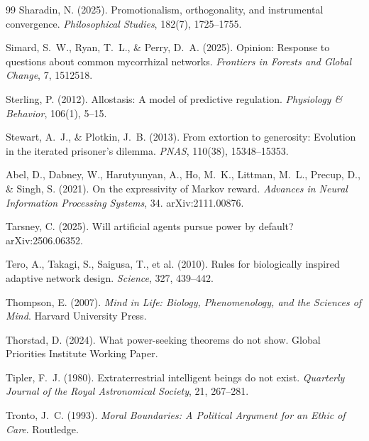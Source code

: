 \documentclass[11pt,a4paper,twocolumn]{article}
\begin{document}
\begin{thebibliography}{99}
 Sharadin, N. (2025). Promotionalism, orthogonality, and instrumental convergence. \textit{Philosophical Studies}, 182(7), 1725--1755.

 Simard, S.~W., Ryan, T.~L., \& Perry, D.~A. (2025). Opinion: Response to questions about common mycorrhizal networks. \textit{Frontiers in Forests and Global Change}, 7, 1512518.


 Sterling, P. (2012). Allostasis: A model of predictive regulation. \textit{Physiology \& Behavior}, 106(1), 5--15.

 Stewart, A.~J., \& Plotkin, J.~B. (2013). From extortion to generosity: Evolution in the iterated prisoner's dilemma. \textit{PNAS}, 110(38), 15348--15353.

 Abel, D., Dabney, W., Harutyunyan, A., Ho, M.~K., Littman, M.~L., Precup, D., \& Singh, S. (2021). On the expressivity of Markov reward. \textit{Advances in Neural Information Processing Systems}, 34. arXiv:2111.00876.

 Tarsney, C. (2025). Will artificial agents pursue power by default? arXiv:2506.06352.

 Tero, A., Takagi, S., Saigusa, T., et al. (2010). Rules for biologically inspired adaptive network design. \textit{Science}, 327, 439--442.

 Thompson, E. (2007). \textit{Mind in Life: Biology, Phenomenology, and the Sciences of Mind}. Harvard University Press.

 Thorstad, D. (2024). What power-seeking theorems do not show. Global Priorities Institute Working Paper.

 Tipler, F.~J. (1980). Extraterrestrial intelligent beings do not exist. \textit{Quarterly Journal of the Royal Astronomical Society}, 21, 267--281.

 Tronto, J.~C. (1993). \textit{Moral Boundaries: A Political Argument for an Ethic of Care}. Routledge.


\end{thebibliography}
\end{document}
